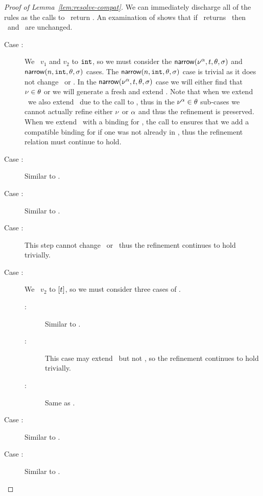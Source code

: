 \begin{proof}[Proof of Lemma~\ref{lem:resolve-compat}]
  We can immediately discharge all of the  rules
  as the calls to \forcesym\ return \stuck.
  An examination of \forcesym shows that if \forcesym\ returns \stuck\
  then \vsu\ and \tsu\ are unchanged.
  \begin{description}
  \item[Case \replusgood:]
    We \forcesym\ $v_1$ and $v_2$ to $\mathtt{int}$, so we must consider
    the $\mathsf{narrow}(\nu^{\alpha}, t, \theta, \sigma)$ and
    $\mathsf{narrow}(n, \mathtt{int}, \theta, \sigma)$ cases.
    The $\mathsf{narrow}(n, \mathtt{int}, \theta, \sigma)$ case is trivial as it does
    not change \vsu\ or \tsu.
    In the $\mathsf{narrow}(\nu^{\alpha}, t, \theta, \sigma)$ case we will either
    find that $\nu \in \theta$ or we will generate a fresh \tint
    and extend \vsu.
    Note that when we extend \vsu\ we also extend \tsu\ due to the
    call to \unifysym, thus in the $\nu^{\alpha} \in \theta$ sub-cases we cannot
    actually refine either $\nu$ or $\alpha$ and thus the
    refinement is preserved.
    When we extend \vsu\ with a binding for \ehole, the call to
    \unifysym ensures that we add a compatible binding for
    \thole if one was not already in \tsu, thus the refinement
    relation must continue to hold.
  \item[Case :]
    Similar to \replusgood.
  \item[Case \reappgood:]
    Similar to \replusgood.
  \item[Case \renilgood:]
    This step cannot change \vsu\ or \tsu\ thus the refinement
    continues to hold trivially.
  \item[Case \reconsgood:]
    We \forcesym\ $v_2$ to $[t]$, so we must consider
    three cases of \forcesym.
    \begin{description}
    \item[:]
      Similar to \replusgood.
    \item[:]
      This case may extend \tsu\ but not \vsu, so the refinement
      continues to hold trivially.
    \item[:]
      Same as .
    \end{description}
  \item[Case :]
    Similar to \replusgood.
  \item[Case \repcasegood:]
    Similar to \replusgood.
  \end{description}
\end{proof}


